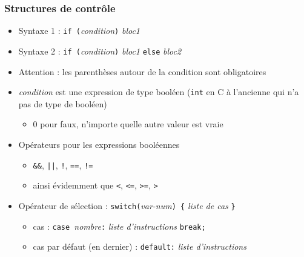 \begin{frame}[fragile]
\frametitle{Structures de contrôle}
\begin{itemize}
\item Syntaxe 1 : \verb|if (|\textit{condition}\verb|)| \textit{bloc1}
\item Syntaxe 2 : \verb|if (|\textit{condition}\verb|)| \textit{bloc1} \verb|else| \textit{bloc2}
\item \alert{Attention} : les parenthèses autour de la condition sont obligatoires
\item \textit{condition} est une expression de type booléen (\verb|int| en C à l'ancienne qui n'a pas de type de booléen)
\begin{itemize}
\item 0 pour faux, n'importe quelle autre valeur est vraie
\end{itemize}
\item Opérateurs pour les expressions booléennes
\begin{itemize}
\item \verb|&&|, \verb#||#, \verb|!|, \verb|==|, \verb|!=|
\item ainsi évidemment que \verb|<|, \verb|<=|, \verb|>=|, \verb|>|
\end{itemize}
\item Opérateur de sélection : \verb|switch(|\textit{var-num}\verb|) {| \textit{liste de cas} \verb|}|
\begin{itemize}
\item cas : \verb|case |\textit{nombre}\verb|:| \textit{liste d'instructions} \verb|break;|
\item cas par défaut (en dernier) : \verb|default:|  \textit{liste d'instructions}
\end{itemize}
\end{itemize}
\end{frame}


